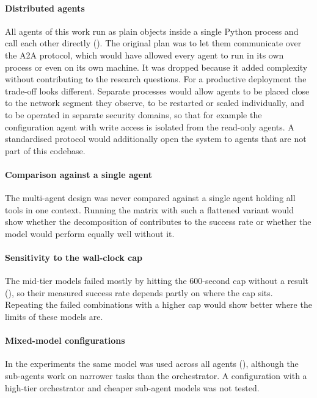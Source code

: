 \paragraph{Distributed agents} All agents of this work run as plain objects inside a single
Python process and call each other directly (). The original plan was
to let them communicate over the A2A protocol, which would have allowed every agent to run in
its own process or even on its own machine. It was dropped because it added complexity without
contributing to the research questions. For a productive deployment the trade-off looks
different. Separate processes would allow agents to be placed close to the network segment they
observe, to be restarted or scaled individually, and to be operated in separate security
domains, so that for example the configuration agent with write access is isolated from the
read-only agents. A standardised protocol would additionally open the system to agents that are
not part of this codebase. 

\paragraph{Comparison against a single agent} The multi-agent design was never compared against a single agent holding
all tools in one context. Running the matrix with such a flattened variant would show whether
the decomposition of  contributes to the success rate or whether the
model would perform equally well without it.

\paragraph{Sensitivity to the wall-clock cap} The mid-tier models failed mostly by hitting the 600-second cap without a
result (), so their measured success rate depends partly on where
the cap sits. Repeating the failed combinations with a higher cap would show better where the limits of these models are.

\paragraph{Mixed-model configurations} In the
experiments the same model was used across all agents (), although the
sub-agents work on narrower tasks than the orchestrator. A configuration with a high-tier
orchestrator and cheaper sub-agent models was not tested.

